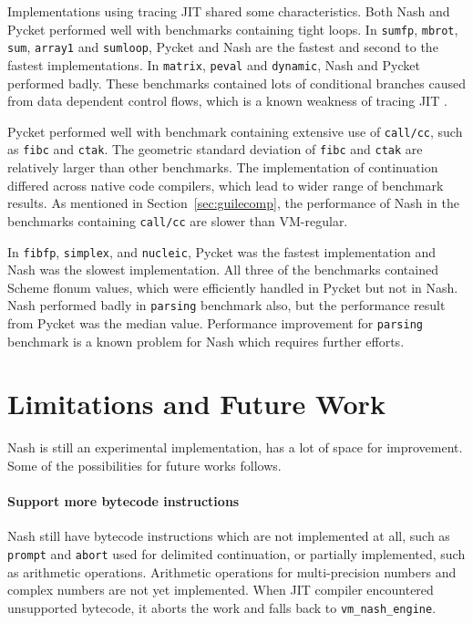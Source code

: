 \documentclass[preprint, 10pt]{sigplanconf}
\begin{document}
Implementations using tracing JIT shared some characteristics. Both Nash and
Pycket performed well with benchmarks containing tight loops. In
\texttt{sumfp}, \texttt{mbrot}, \texttt{sum}, \texttt{array1} and
\texttt{sumloop}, Pycket and Nash are the fastest and second to the fastest
implementations.  In \texttt{matrix}, \texttt{peval} and \texttt{dynamic},
Nash and Pycket performed badly. These benchmarks contained lots of
conditional branches caused from data dependent control flows, which is a
known weakness of tracing JIT \citep{bauman2015pycket}.

Pycket performed well with benchmark containing extensive use of
\texttt{call/cc}, such as \texttt{fibc} and \texttt{ctak}. The geometric
standard deviation of \texttt{fibc} and \texttt{ctak} are relatively larger
than other benchmarks. The implementation of continuation differed across
native code compilers, which lead to wider range of benchmark results. As
mentioned in Section~\ref{sec:guilecomp}, the performance of Nash in the
benchmarks containing \texttt{call/cc} are slower than VM-regular.

In \texttt{fibfp}, \texttt{simplex}, and \texttt{nucleic}, Pycket was the
fastest implementation and Nash was the slowest implementation. All three of
the benchmarks contained Scheme flonum values, which were efficiently handled
in Pycket but not in Nash.  Nash performed badly in \texttt{parsing} benchmark
also, but the performance result from Pycket was the median value. Performance
improvement for \texttt{parsing} benchmark is a known problem for Nash which
requires further efforts.

\section{Limitations and Future Work}
\label{sec:future}

Nash is still an experimental implementation, has a lot of space for
improvement. Some of the possibilities for future works follows.

\paragraph{Support more bytecode instructions} Nash still have bytecode
instructions which are not implemented at all, such as \texttt{prompt} and
\texttt{abort} used for delimited continuation, or partially implemented, such
as arithmetic operations. Arithmetic operations for multi-precision numbers
and complex numbers are not yet implemented. When JIT compiler encountered
unsupported bytecode, it aborts the work and falls back to
\texttt{vm\_nash\_engine}.
\end{document}
